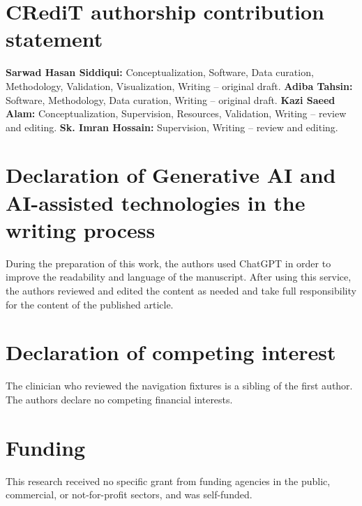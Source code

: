 \documentclass[preprint,12pt,a4paper]{elsarticle}
\begin{document}
\section*{CRediT authorship contribution statement}
\textbf{Sarwad Hasan Siddiqui:} Conceptualization,  Software, Data curation, Methodology, Validation, Visualization, Writing -- original draft. \textbf{Adiba Tahsin:} Software, Methodology, Data curation, Writing -- original draft. \textbf{Kazi Saeed Alam:} Conceptualization, Supervision, Resources, Validation, Writing -- review and editing. \textbf{Sk. Imran Hossain:} Supervision, Writing -- review and editing.

\section*{Declaration of Generative AI and AI-assisted technologies in the writing process}
During the preparation of this work, the authors used ChatGPT in order to improve the readability and language of the manuscript. After using this service, the authors reviewed and edited the content as needed and take full responsibility for the content of the published article.

\section*{Declaration of competing interest}
The clinician who reviewed the navigation fixtures is a sibling of the first author.
The authors declare no competing financial interests.

\section*{Funding}
This research received no specific grant from funding agencies in the public,
commercial, or not-for-profit sectors, and was self-funded.
\end{document}
